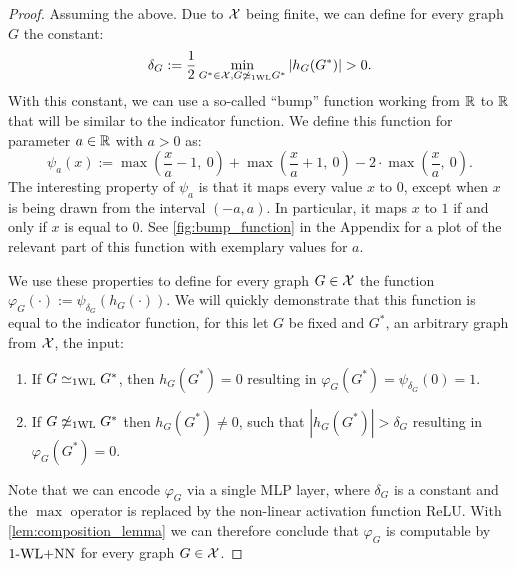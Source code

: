 \begin{proof}
    Assuming the above. Due to $\mathcal{X}$ being finite, we can define for every graph $G$ the constant:
    \begin{equation*}
        \delta_G := \frac{1}{2} \min_{G^* \in \mathcal{X} , G \not\simeq_{\text{1WL}} G^*} |h_G(G^*)| > 0.
    \end{equation*}
    With this constant, we can use a so-called ``bump'' function working from $\mathbb{R}$ to $\mathbb{R}$ that will be similar to the indicator function. We define this function for parameter $a \in \mathbb{R}$ with $a > 0$ as:
    \begin{equation*}
        \psi_a(x) := \max(\frac{x}{a} -1,\ 0) + \max(\frac{x}{a}+1, \ 0) - 2 \cdot \max(\frac{x}{a}, \ 0).
    \end{equation*}
    The interesting property of $\psi_a$ is that it maps every value $x$ to $0$, except when $x$ is being drawn from the interval $(-a, a)$. In particular, it maps $x$ to $1$ if and only if $x$ is equal to $0$. See \autoref{fig:bump_function} in the Appendix for a plot of the relevant part of this function with exemplary values for $a$.
    
    We use these properties to define for every graph $G \in \mathcal{X}$ the function $\varphi_G(\cdot) := \psi_{\delta_G} (h_G(\cdot))$. 
    We will quickly demonstrate that this function is equal to the indicator function, for this let $G$ be fixed and $G^*$, an arbitrary graph from $\mathcal{X}$, the input:
    \begin{enumerate}
        \item If $G \simeq_{\text{1WL}} G^*$, then $h_G(G^*) = 0$ resulting in $\varphi_G(G^*) = \psi_{\delta_G}(0) = 1$.
        \item If $G \not\simeq_{\text{1WL}} G^*$ then $h_G(G^*) \neq 0$, such that $|h_G(G^*)|> \delta_G$ resulting in $\varphi_G(G^*) = 0$.
    \end{enumerate}
    Note that we can encode $\varphi_G$ via a single MLP layer, where $\delta_G$ is a constant and the $\max$ operator is replaced by the non-linear activation function ReLU. With \cref{lem:composition_lemma} we can therefore conclude that $\varphi_G$ is computable by $\text{1-WL+NN}$ for every graph $G \in \mathcal{X}$.
\end{proof}

